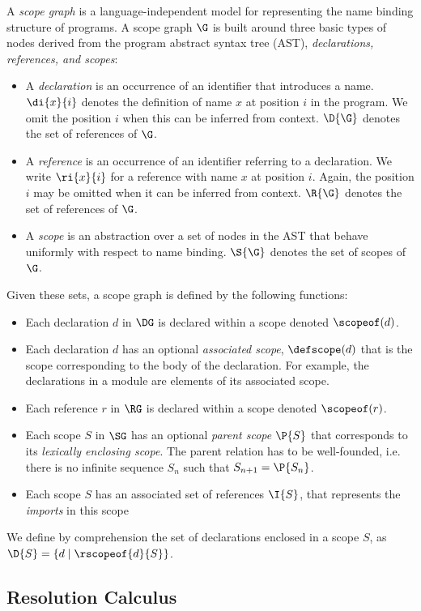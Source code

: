 A \emph{scope graph} is a language-independent model for representing the name
binding structure of programs. A scope graph $\G$ is built around three basic
types of nodes derived from the program abstract syntax tree (AST),
\emph{declarations, references, and scopes}:
\begin{itemize}
 \item A \emph{declaration} is an occurrence of an identifier that introduces a
 name. $\di{x}{i}$ denotes the definition of name $x$ at position $i$ in the
 program. 
 We omit the position $i$ when this can be inferred from context.
 $\D{\G}$ denotes the set of references of $\G$.
 \item A \emph{reference} is an occurrence of an identifier referring to a
 declaration. We write $\ri{x}{i}$ for a reference with name $x$ at position
 $i$. 
 Again, the position $i$ may be omitted when it can be inferred from
 context. 
 $\R{\G}$ denotes the set of references of $\G$.
 \item A \emph{scope} is an abstraction over a set of nodes in the AST that
 behave uniformly with respect to name binding. $\S{\G}$ denotes the set of
 scopes of $\G$.
\end{itemize}
Given these sets, a scope graph is defined by the following functions:
\begin{itemize}
 \item Each declaration $d$ in $\DG$ is declared within a scope denoted
 $\scopeof(d)$.
 \item Each declaration $d$ has an optional \emph{associated scope},
 $\defscope(d)$ that is the scope corresponding to the body of the
 declaration. For example, the declarations in a module are elements of its
 associated scope.
 \item Each reference $r$ in $\RG$ is declared within a scope denoted
 $\scopeof(r)$.
 \item Each scope $S$ in $\SG$ has an optional \emph{parent scope} $\P{S}$ that 
 corresponds to its \emph{lexically enclosing scope}. The parent relation has
 to be well-founded, i.e. there is no infinite sequence $S_n$ such that 
 $S_{n+1} = \P{S_n}$.
 \item Each scope $S$ has an associated set of references $\I{S}$, that 
 represents the \emph{imports} in this scope
\end{itemize}
We define by comprehension the set of declarations enclosed in a scope
$S$, as $\D{S} = \{ d \mid \rscopeof{d}{S}\}$.

\subsection{Resolution Calculus}

